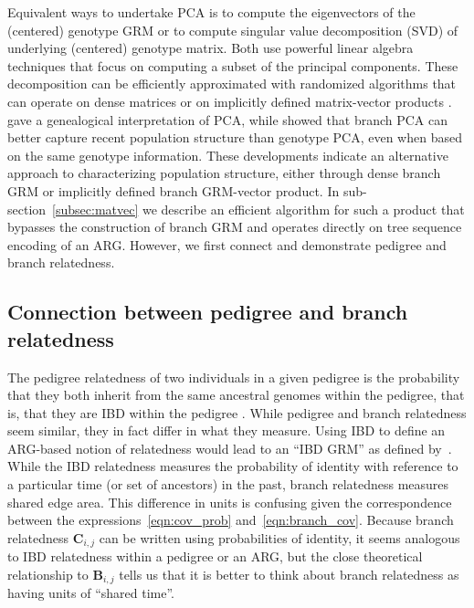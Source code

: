 Equivalent ways to undertake PCA is
to compute the eigenvectors of the (centered) genotype GRM or
to compute singular value decomposition (SVD) of underlying (centered) genotype matrix.
Both use powerful linear algebra techniques that focus on computing a subset of the principal components.
These decomposition can be efficiently approximated with randomized algorithms that can operate on
dense matrices or on implicitly defined matrix-vector products \citep{halko2011findingstructure}.
\citet{mcvean2009genealogical} gave a genealogical interpretation of PCA, while
\citet{fan2022genealogical} showed that branch PCA can better capture recent population structure than genotype PCA,
even when based on the same genotype information.
These developments indicate an alternative approach to characterizing population structure,
either through dense branch GRM or implicitly defined branch GRM-vector product.
In sub-section~\ref{subsec:matvec} we describe an efficient algorithm for
such a product that bypasses the construction of branch GRM
and operates directly on tree sequence encoding of an ARG.
However, we first connect and demonstrate pedigree and branch relatedness.

\subsection{Connection between pedigree and branch relatedness}
The pedigree relatedness of two individuals in a given pedigree is
the probability that they both inherit from the same ancestral genomes within the pedigree,
that is, that they are IBD within the pedigree \citep{malecot1969mathemathics}.
%
While pedigree and branch relatedness seem similar,
they in fact differ in what they measure.
%
Using IBD to define an ARG-based notion of relatedness would lead to an ``IBD GRM''
as defined by~\citet{tsambos2022efficient}.
%
While the IBD relatedness measures the
probability of identity with reference to a particular time (or set of ancestors) in the past,
branch relatedness measures shared edge area.
%
This difference in units is confusing given the correspondence between
the expressions~\eqref{eqn:cov_prob} and~\eqref{eqn:branch_cov}.
%
Because branch relatedness $\mathbf{C}_{i,j}$ can be written using probabilities of identity,
it seems analogous to IBD relatedness within a pedigree or an ARG,
but the close theoretical relationship to $\mathbf{B}_{i,j}$
tells us that it is better to think about branch relatedness as having units of ``shared time''.

